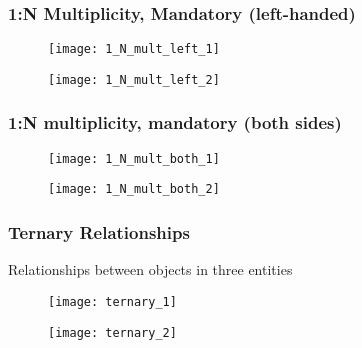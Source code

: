 \subsubsection{1:N Multiplicity, Mandatory (left-handed)}

\begin{minipage}{0.45\textwidth}
\begin{figure}[H]
    \centering
    \texttt{[image: 1\_N\_mult\_left\_1]}
\end{figure}
\end{minipage}
\hfill
\begin{minipage}{0.45\textwidth}
\begin{figure}[H]
    \centering
    \texttt{[image: 1\_N\_mult\_left\_2]}
\end{figure}
\end{minipage}

\subsubsection{1:N multiplicity, mandatory (both sides)}

\begin{minipage}{0.45\textwidth}
\begin{figure}[H]
    \centering
    \texttt{[image: 1\_N\_mult\_both\_1]}
\end{figure}
\end{minipage}
\hfill
\begin{minipage}{0.45\textwidth}
\begin{figure}[H]
    \centering
    \texttt{[image: 1\_N\_mult\_both\_2]}
\end{figure}
\end{minipage}

\subsubsection{Ternary Relationships}

Relationships between objects in three entities

\begin{minipage}{0.45\textwidth}
\begin{figure}[H]
    \centering
    \texttt{[image: ternary\_1]}
\end{figure}
\end{minipage}
\hfill
\begin{minipage}{0.45\textwidth}
\begin{figure}[H]
    \centering
    \texttt{[image: ternary\_2]}
\end{figure}
\end{minipage}

